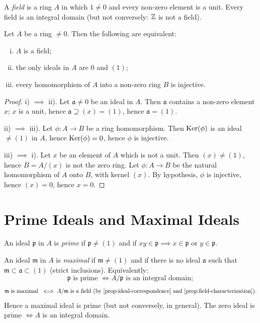 A \emph{field} is a ring $A$ in which $1 \neq 0$ and every non-zero element is a unit. Every field is an integral domain (but not conversely: $\mathbb{Z}$ is not a field).

\begin{proposition}\label{prop:field-characterization}
Let $A$ be a ring $\neq 0$. Then the following are equivalent:
\begin{enumerate}[i)]
    \item $A$ is a field;
    \item the only ideals in $A$ are $0$ and $(1)$;
    \item every homomorphism of $A$ into a non-zero ring $B$ is injective.
\end{enumerate}
\end{proposition}

\begin{proof}
\noindent i) $\implies$ ii). Let $\mathfrak{a} \neq 0$ be an ideal in $A$. Then $\mathfrak{a}$ contains a non-zero element $x$; $x$ is a unit, hence $\mathfrak{a} \supseteq (x) = (1)$, hence $\mathfrak{a} = (1)$.

ii) $\implies$ iii). Let $\phi \colon A \to B$ be a ring homomorphism. Then $\operatorname{Ker}(\phi)$ is an ideal $\neq (1)$ in $A$, hence $\operatorname{Ker}(\phi) = 0$, hence $\phi$ is injective.

iii) $\implies$ i). Let $x$ be an element of $A$ which is not a unit. Then $(x) \neq (1)$, hence $B = A/(x)$ is not the zero ring. Let $\phi \colon A \to B$ be the natural homomorphism of $A$ onto $B$, with kernel $(x)$. By hypothesis, $\phi$ is injective, hence $(x) = 0$, hence $x = 0$.
\end{proof}


\section*{Prime Ideals and Maximal Ideals}

An ideal $\mathfrak{p}$ in $A$ is \emph{prime} if $\mathfrak{p} \neq (1)$ and if $xy \in \mathfrak{p} \implies x \in \mathfrak{p}$ or $y \in \mathfrak{p}$.

An ideal $\mathfrak{m}$ in $A$ is \emph{maximal} if $\mathfrak{m} \neq (1)$ and if there is no ideal $\mathfrak{a}$ such that $\mathfrak{m} \subset \mathfrak{a} \subset (1)$ (strict inclusions). Equivalently:
\[
    \mathfrak{p} \text{ is prime } \iff A/\mathfrak{p} \text{ is an integral domain};
\]
\[
    \mathfrak{m} \text{ is maximal } \iff A/\mathfrak{m} \text{ is a field (by \eqref{prop:ideal-correspondence} and \eqref{prop:field-characterization})}.
\]
Hence a maximal ideal is prime (but not conversely, in general). The zero ideal is prime $\iff A$ is an integral domain.

